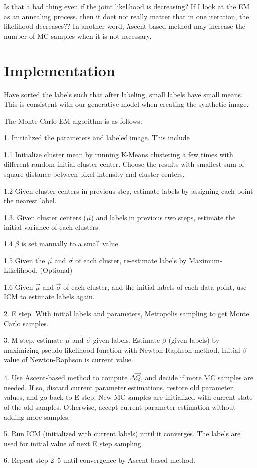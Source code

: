 \documentclass{article}
\begin{document}
Is that a bad thing even if the joint likelihood is decreasing? If I look at the EM as an annealing process, then it doet not really matter that in one iteration, the likelihood decreases?? In another word, Ascent-based method may increase the number of MC samples when it is not necessary. 


\section{Implementation}
Have sorted the labels such that after labeling, small labels have small means. This is consistent with our generative model when creating the synthetic image.

The Monte Carlo EM algorithm is as follows:
\begin{itemize*}
  
\item[1.] Initialized the parameters and labeled image. This
  include
  \begin{itemize*}
  \item [1.1 ]Initialize cluster mean by running K-Means clustering a
    few times with different random initial cluster center. Choose the
    results with smallest sum-of-square distance between pixel
    intensity and cluster centers.
  \item[1.2 ] Given cluster centers in previous step, estimate labels by
    assigning each point the nearest label.
  \item [1.3. ]Given cluster centers ($\vec \mu$) and labels in previous two
    steps, estimate the initial variance of each clusters.
  \item[1.4 ] $\beta$ is set manually to a small value.
  \item[1.5 ] Given the $\vec \mu$ and $\vec \sigma$ of each cluster, re-estimate
    labels by Maximum-Likelihood. (Optional)
  \item[1.6 ]Given $\vec \mu$ and $\vec \sigma$ of each cluster, and
    the initial labels of each data point, use ICM to estimate labels
    again.
  \end{itemize*}
\item[2. ] E step. With initial labels and parameters, Metropolis
  sampling to get Monte Carlo samples.
\item[3. ] M step. estimate $\vec \mu$ and $\vec \sigma$ given labels. Estimate
  $\beta$ (given labels) by maximizing pseudo-likelihood function with
  Newton-Raphson method. Initial $\beta$ value of Newton-Raphson is
  current value.
\item [4. ] Use Ascent-based method to compute $\Delta \vec Q$, and
  decide if more MC samples are needed. If so, discard current
  parameter estimations, restore old parameter values, and go back to
  E step. New MC samples are initialized with current state of the old
  samples. Otherwise, accept current parameter estimation without
  adding more samples.
\item [5. ]  Run ICM (initialized with current labels) until it
  converges. The labels are used for initial value of next E step
  sampling.
\item [6. ]Repeat step 2--5 until convergence by Ascent-based method.


\end{itemize*}
\end{document}
